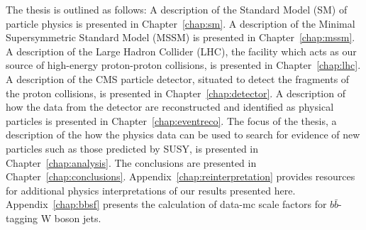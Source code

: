 The thesis is outlined as follows: A description of the Standard Model (SM) of particle physics is presented in Chapter~\ref{chap:sm}. A description of the Minimal Supersymmetric Standard Model (MSSM) is presented in Chapter~\ref{chap:mssm}. A description of the Large Hadron Collider (LHC), the facility which acts as our source of high-energy proton-proton collisions, is presented in Chapter~\ref{chap:lhc}. A description of the CMS particle detector, situated to detect the fragments of the proton collisions, is presented in Chapter~\ref{chap:detector}. A description of how the data from the detector are reconstructed and identified as physical particles is presented in Chapter~\ref{chap:eventreco}. The focus of the thesis, a description of the how the physics data can be used to search for evidence of new particles such as those predicted by SUSY, is presented in Chapter~\ref{chap:analysis}. The conclusions are presented in Chapter~\ref{chap:conclusions}. Appendix~\ref{chap:reinterpretation} provides resources for additional physics interpretations of our results presented here. Appendix~\ref{chap:bbsf} presents the calculation of data-mc scale factors for $b\bar{b}$-tagging W boson jets.
